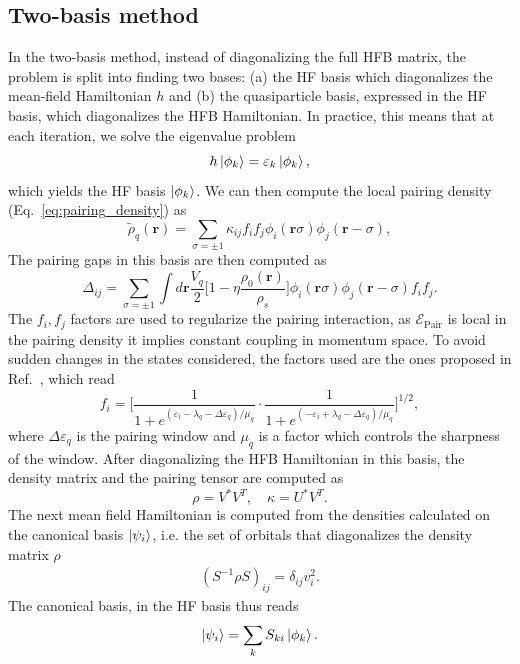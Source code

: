 \documentclass[%
 reprint, linenumbers,
 amsmath,amssymb,
 aps, physrev
]{revtex4-2}
\begin{document}
\subsection{Two-basis method}
In the two-basis method, instead of diagonalizing the full HFB matrix, the problem is split into finding two bases: (a) the HF basis which diagonalizes the mean-field Hamiltonian $h$ and (b) the quasiparticle basis, expressed in the HF basis, which diagonalizes the HFB Hamiltonian.
In practice, this means that at each iteration, we solve the eigenvalue problem
\begin{equation}
  h\ket{\phi_k} = \varepsilon_k\ket{\phi_k},
\end{equation}
which yields the HF basis $\ket{\phi_k}$. We can then compute the local pairing density (Eq.~\ref{eq:pairing_density}) as 
\begin{equation}
  \tilde\rho_q(\bm r) = \sum_{\sigma=\pm 1}\kappa_{ij}f_i f_j\phi_i(\bm r\sigma)\phi_j(\bm r -\sigma),
\end{equation}
The pairing gaps in this basis are then computed as
\begin{equation}
\Delta_{ij}=\sum_{\sigma=\pm 1}\int d\bm r \frac{V_q} 2 \bigg[1-\eta\frac{\rho_0(\bm r )}{\rho_s}\bigg]\phi_i(\bm r \sigma)\phi_j(\bm r -\sigma)f_i f_j.
\end{equation}
The $f_i,f_j$ factors are used to regularize the pairing interaction, as $\mathcal E_\text{Pair}$ is local in the pairing density it implies constant coupling in momentum space. To avoid sudden changes in the states considered, the factors used are the ones proposed in Ref.~\cite{pairing_factors}, which read
\begin{equation}
  \nonumber
  f_i = \bigg[\frac 1 {1+e^{(\varepsilon_i-\lambda_q-\Delta\varepsilon_q)/\mu_q}}\cdot\frac 1 {1+e^{(-\varepsilon_i+\lambda_q-\Delta\varepsilon_q)/\mu_q}}\bigg]^{1/2},
\end{equation}
where $\Delta\varepsilon_q$ is the pairing window and $\mu_q$ is a factor which controls the sharpness of the window.
After diagonalizing the HFB Hamiltonian in this basis, the density matrix and the pairing tensor are computed as
\begin{equation}
\rho = V^*V^T,\quad \kappa = U^*V^T.
\end{equation}
The next mean field Hamiltonian is computed from the densities calculated on the canonical basis $\ket{\psi_i}$, i.e. the set of orbitals that diagonalizes the density matrix $\rho$
\begin{align}
 (S^{-1}\rho S)_{ij} =  \delta_{ij} v_i^2.
\end{align}
The canonical basis, in the HF basis thus reads
\begin{equation}
  \ket{\psi_i} = \sum_{k}S_{ki} \ket{\phi_k}.
\end{equation}
\end{document}
